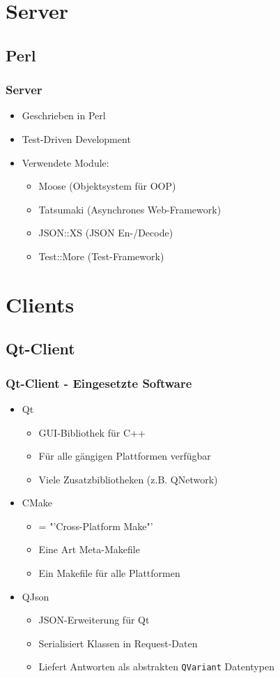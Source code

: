 \documentclass{beamer}
\begin{document}
\section{Server}

\subsection{Perl}
\begin{frame}[fragile]
\frametitle{Server}
\begin{itemize}
\item Geschrieben in Perl
\item Test-Driven Development
\item Verwendete Module:
\begin{itemize}
\item Moose (Objektsystem für OOP)
\item Tatsumaki (Asynchrones Web-Framework)
\item JSON::XS (JSON En-/Decode)
\item Test::More (Test-Framework)
\end{itemize}
\end{itemize}
\end{frame}

\section{Clients}

\subsection{Qt-Client}
\begin{frame}[fragile]
\frametitle{Qt-Client - Eingesetzte Software}
\begin{itemize}
\item Qt
\begin{itemize}
\item GUI-Bibliothek für C++
\item Für alle gängigen Plattformen verfügbar
\item Viele Zusatzbibliotheken (z.B. QNetwork)
\end{itemize}
\item CMake
\begin{itemize}
\item = "'Cross-Platform Make"'
\item Eine Art Meta-Makefile
\item Ein Makefile für alle Plattformen
\end{itemize}
\item QJson
\begin{itemize}
\item JSON-Erweiterung für Qt
\item Serialisiert Klassen in Request-Daten
\item Liefert Antworten als abstrakten \texttt{QVariant} Datentypen
\end{itemize}
\end{itemize}
\end{frame}
\end{document}
